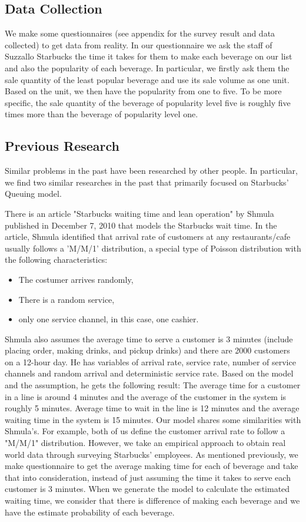 \documentclass[a4paper]{article}
\begin{document}
\subsection{Data Collection}
We make some questionnaires (see appendix for the survey result and data collected) to get data from reality. In our questionnaire we ask the staff of Suzzallo Starbucks the time it takes for them to make each beverage on our list and also the popularity of each beverage.\cite{ranking}  In particular, we firstly ask them the sale quantity of the least popular beverage and use its sale volume as one unit. Based on the unit, we then have the popularity from one to five. To be more specific, the sale quantity of the beverage of popularity level five is roughly five times more than the beverage of popularity level one. 

\subsection{Previous Research}
Similar problems in the past have been researched by other people. In particular, we find two similar researches in the past that primarily focused on Starbucks' Queuing model. 

There is an article "Starbucks waiting time and lean operation" by Shmula published in December 7, 2010 that models the Starbucks wait time. In the article, Shmula identified that arrival rate of customers at any restaurants/cafe usually follows a 'M/M/1' distribution, a special type of Poisson distribution with the following characteristics:\cite{analyzing}

\begin{itemize}
\item The costumer arrives randomly,
\item There is a random service,
\item only one service channel, in this case, one cashier. 
\end{itemize}

Shmula also assumes the average time to serve a customer is 3 minutes (include placing order, making drinks, and pickup drinks) and there are 2000 customers on a 12-hour day. He has variables of arrival rate, service rate, number of service channels and random arrival and deterministic service rate. Based on the model and the assumption, he gets the following result: The average time for a customer in a line is around 4 minutes and the average of the customer in the system is roughly 5 minutes. Average time to wait in the line is 12 minutes and the average waiting time in the system is 15 minutes. 
Our model shares some similarities with Shmula's. For example, both of us define the customer arrival rate to follow a "M/M/1" distribution. However, we take an empirical approach to obtain real world data through surveying Starbucks' employees. As mentioned previously, we make questionnaire to get the average making time for each of beverage and take that into consideration, instead of just assuming the time it takes to serve each customer is 3 minutes. When we generate the model to calculate the estimated waiting time, we consider that there is difference of making each beverage and we have the estimate probability of each beverage. 
\end{document}
